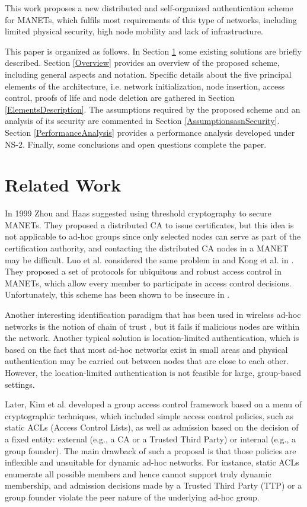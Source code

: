 \documentclass{article}
\begin{document}
This work proposes a new distributed and self-organized 
authentication scheme for MANETs, which fulfils most requirements of this type of networks, including limited
physical security, high node mobility and lack of infrastructure. 

This paper is organized as follows. In Section \ref{Existing} some existing solutions are briefly described. Section \ref{Overview} provides
an overview of the proposed scheme, including general aspects and notation. Specific details about the five principal elements of the architecture, i.e.  network initialization, node insertion, access control, proofs of life and node deletion are gathered in Section \ref{ElementsDescription}. The assumptions required by the proposed scheme and an analysis of its security are
commented in Section \ref{AssumptionsasnSecurity}. Section \ref{PerformanceAnalysis} provides a performance analysis developed under NS-2. Finally, some conclusions and open questions complete
the paper.

\section{Related Work}
\label{Existing}

In 1999 Zhou and Haas \cite{ZH99} suggested using threshold cryptography to secure MANETs. They proposed a distributed CA to issue certificates, but this idea is not applicable to ad-hoc groups since only selected nodes can serve as part of the certification authority, and contacting the distributed CA nodes in a MANET may be difficult.
Luo et al. considered the same problem in \cite{Luoetal00} 
and Kong et al. in \cite{Kongetal02}. They proposed a set of protocols for ubiquitous and robust access control in MANETs, which allow every member to participate in access control decisions. Unfortunately, this scheme has been shown to be insecure in \cite{JSY04}. 

Another interesting identification paradigm that has been used in
wireless ad-hoc networks is the notion of  chain of trust
\cite{HBC01}, but it fails if malicious nodes are within the network. 
Another typical solution is location-limited
authentication, which is based on the fact that most ad-hoc
networks exist in small areas and physical authentication may be
carried out between nodes that are close to each other. 
However, the location-limited authentication is not feasible for large, group-based settings.

Later, Kim et al. \cite{KMT03}
developed a group
access control framework based on a menu of cryptographic techniques, which
included simple access control policies, such as static ACLs (Access Control Lists), as well as admission based on the decision
of a fixed entity: external (e.g., a CA or a Trusted Third Party) or internal (e.g., a group founder). The main drawback of such a proposal is that those policies are inflexible and unsuitable for dynamic ad-hoc networks.  For instance, static ACLs enumerate all possible members and hence cannot support truly dynamic membership, and admission decisions made by a Trusted Third Party (TTP) or a group founder violate the peer nature of the underlying ad-hoc group.
\end{document}
